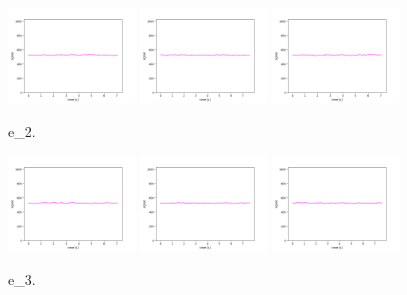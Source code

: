 \begin{figure}[!ht]
\begin{center}
\includegraphics[width=0.3\textwidth]{../data/e_2/e_2_1.png}
\includegraphics[width=0.3\textwidth]{../data/e_2/e_2_2.png}
\includegraphics[width=0.3\textwidth]{../data/e_2/e_2_3.png}
\caption{e\_2.\label{fig:e_2}}
\end{center}
\end{figure}

\begin{figure}[!ht]
\begin{center}
\includegraphics[width=0.3\textwidth]{../data/e_3/e_3_1.png}
\includegraphics[width=0.3\textwidth]{../data/e_3/e_3_2.png}
\includegraphics[width=0.3\textwidth]{../data/e_3/e_3_3.png}
\caption{e\_3.\label{fig:e_3}}
\end{center}
\end{figure}

